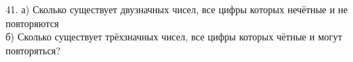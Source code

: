 41. а) Сколько существует двузначных чисел, все цифры которых нечётные и не повторяются\\
б) Сколько существует трёхзначных чисел, все цифры которых чётные и могут повторяться?\\
